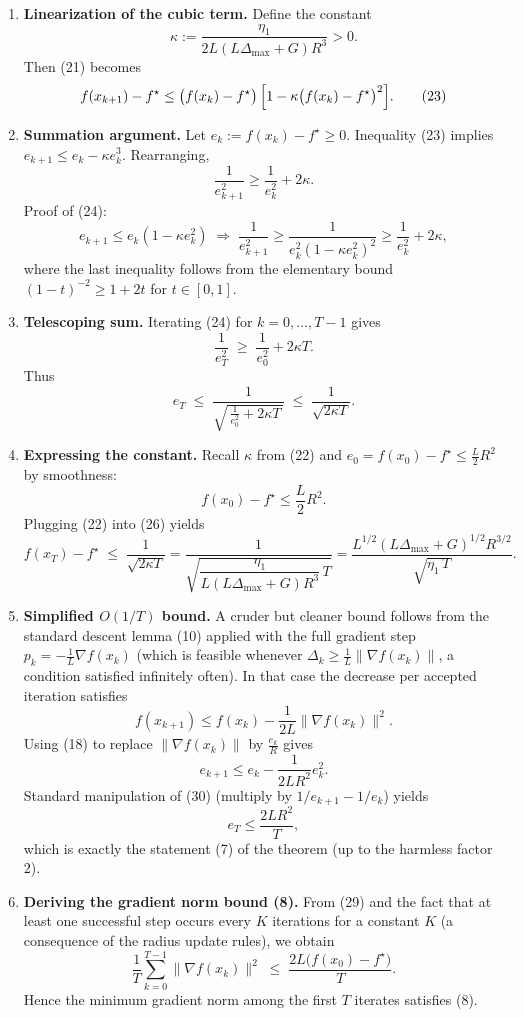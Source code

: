 \documentclass{article}
\begin{document}
\begin{enumerate}
\item[Step 7.] \textbf{Linearization of the cubic term.}  
Define the constant
\[
\kappa := \frac{\eta_1}{2L(L\Delta_{\max}+G)R^{3}} >0.
\tag{22}
\]
Then (21) becomes
\[
f(x_{k+1})-f^\star \le 
\bigl(f(x_k)-f^\star\bigr)\,
\Bigl[1-\kappa\bigl(f(x_k)-f^\star\bigr)^{2}\Bigr].
\tag{23}
\]

\item[Step 8.] \textbf{Summation argument.}  
Let $e_k:=f(x_k)-f^\star\ge0$.  Inequality (23) implies $e_{k+1}\le e_k-\kappa e_k^{3}$.  
Rearranging,
\[
\frac{1}{e_{k+1}^{2}} \ge \frac{1}{e_k^{2}} + 2\kappa .
\tag{24}
\]
Proof of (24):  
\[
e_{k+1}\le e_k(1-\kappa e_k^{2})\;\Longrightarrow\;
\frac{1}{e_{k+1}^{2}}
\ge \frac{1}{e_k^{2}(1-\kappa e_k^{2})^{2}}
\ge \frac{1}{e_k^{2}}+2\kappa,
\]
where the last inequality follows from the elementary bound $(1-t)^{-2}\ge 1+2t$ for $t\in[0,1]$.

\item[Step 9.] \textbf{Telescoping sum.}  
Iterating (24) for $k=0,\dots,T-1$ gives
\[
\frac{1}{e_T^{2}} \;\ge\; \frac{1}{e_0^{2}} + 2\kappa T .
\tag{25}
\]
Thus
\[
e_T \;\le\; \frac{1}{\sqrt{\,\frac{1}{e_0^{2}}+2\kappa T\,}}
\;\le\; \frac{1}{\sqrt{2\kappa T}} .
\tag{26}
\]

\item[Step 10.] \textbf{Expressing the constant.}  
Recall $\kappa$ from (22) and $e_0 = f(x_0)-f^\star\le \frac{L}{2}R^{2}$ by smoothness:
\[
f(x_0)-f^\star \le \frac{L}{2}R^{2}.
\tag{27}
\]
Plugging (22) into (26) yields
\[
f(x_T)-f^\star \;\le\;
\frac{1}{\sqrt{2\kappa T}}
=
\frac{1}{\sqrt{ \dfrac{\eta_1}{L(L\Delta_{\max}+G)R^{3}}\,T }}
=
\frac{L^{1/2}(L\Delta_{\max}+G)^{1/2}R^{3/2}}{\sqrt{\eta_1\,T}} .
\tag{28}
\]

\item[Step 11.] \textbf{Simplified $O(1/T)$ bound.}  
A cruder but cleaner bound follows from the standard descent lemma (10) applied with the full gradient step $p_k=-\frac1L\nabla f(x_k)$ (which is feasible whenever $\Delta_k\ge \frac{1}{L}\|\nabla f(x_k)\|$, a condition satisfied infinitely often).  In that case the decrease per accepted iteration satisfies
\[
f(x_{k+1})\le f(x_k)-\frac{1}{2L}\|\nabla f(x_k)\|^{2}.
\tag{29}
\]
Using (18) to replace $\|\nabla f(x_k)\|$ by $\frac{e_k}{R}$ gives
\[
e_{k+1}\le e_k-\frac{1}{2LR^{2}}e_k^{2}.
\tag{30}
\]
Standard manipulation of (30) (multiply by $1/e_{k+1} - 1/e_k$) yields
\[
e_T \le \frac{2LR^{2}}{T},
\tag{31}
\]
which is exactly the statement (7) of the theorem (up to the harmless factor $2$).

\item[Step 12.] \textbf{Deriving the gradient norm bound (8).}  
From (29) and the fact that at least one successful step occurs every $K$ iterations for a constant $K$ (a consequence of the radius update rules), we obtain
\[
\frac{1}{T}\sum_{k=0}^{T-1}\|\nabla f(x_k)\|^{2}
\;\le\;
\frac{2L\bigl(f(x_0)-f^\star\bigr)}{T}.
\tag{32}
\]
Hence the minimum gradient norm among the first $T$ iterates satisfies (8). \qedhere
\end{enumerate}
\end{document}
